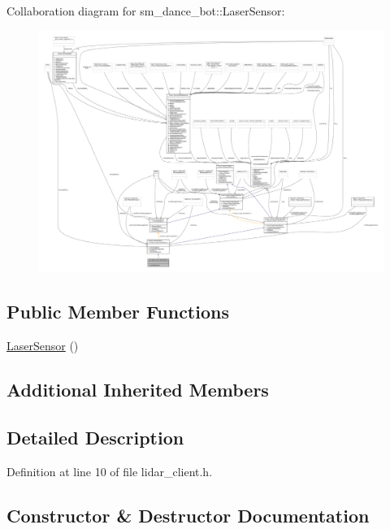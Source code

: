 Collaboration diagram for sm\+\_\+dance\+\_\+bot\+:\+:Laser\+Sensor\+:
\nopagebreak
\begin{figure}[H]
\begin{center}
\leavevmode
\includegraphics[width=350pt]{classsm__dance__bot_1_1LaserSensor__coll__graph}
\end{center}
\end{figure}
\subsection*{Public Member Functions}
\begin{DoxyCompactItemize}
\item 
\hyperlink{classsm__dance__bot_1_1LaserSensor_a0481dda00cf1487cf8673400f0e1c0aa}{Laser\+Sensor} ()
\end{DoxyCompactItemize}
\subsection*{Additional Inherited Members}


\subsection{Detailed Description}


Definition at line 10 of file lidar\+\_\+client.\+h.



\subsection{Constructor \& Destructor Documentation}
